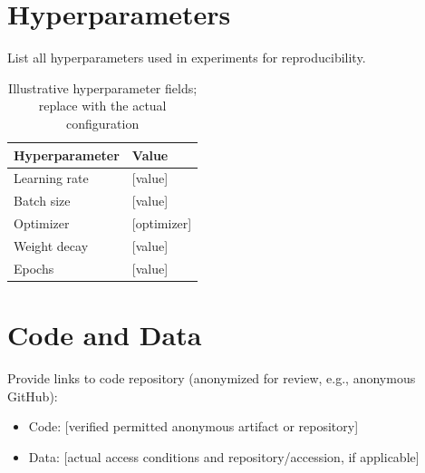\documentclass{article}
\begin{document}
\section{Hyperparameters}
\label{app:hyperparameters}

List all hyperparameters used in experiments for reproducibility.

\begin{table}[h]
\centering
\caption{Illustrative hyperparameter fields; replace with the actual configuration}
\begin{tabular}{ll}
\toprule
Hyperparameter & Value \\
\midrule
Learning rate & [value] \\
Batch size & [value] \\
Optimizer & [optimizer] \\
Weight decay & [value] \\
Epochs & [value] \\
\bottomrule
\end{tabular}
\end{table}

\section{Code and Data}
\label{app:code}

Provide links to code repository (anonymized for review, e.g., anonymous GitHub):
\begin{itemize}
    \item Code: [verified permitted anonymous artifact or repository]
    \item Data: [actual access conditions and repository/accession, if applicable]
\end{itemize}


\end{document}
